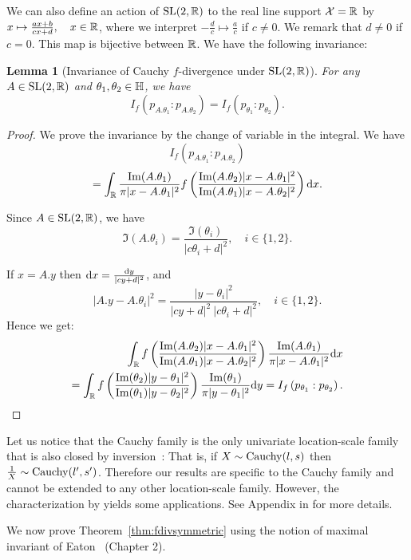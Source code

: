 \documentclass[journal]{IEEEtran}
\newtheorem{lemma}[theorem]{Lemma}
\begin{document}
We can also define an action of $\mathrm{SL}(2, \mathbb{R})$ to the real line support $\mathcal{X}={\mathbb{R}}$ by 
$x \mapsto \frac{ax+b}{cx+d}, \ \ \ x \in {\mathbb{R}}$,
where we interpret $-\frac{d}{c} \mapsto \frac{a}{c}$
if $c \not= 0$. 
We remark that $d \not= 0$ if $c = 0$. 
This map is bijective between ${\mathbb{R}}$. 
We have the following invariance:

\begin{lemma}[Invariance of Cauchy $f$-divergence under $\mathrm{SL}(2, {\mathbb{R}})$]\label{lemma:finv}
For any $A\in\mathrm{SL}(2, {\mathbb{R}})$ and $\theta_1,\theta_2\in\mathbb{H}$, we have
$$
I_f(p_{A.\theta_1}:p_{A.\theta_2})=I_f(p_{\theta_1}:p_{\theta_2}).
$$
\end{lemma}

\begin{proof} 
We prove the invariance by the change of variable in the integral. 
We have 
$$
I_f (p_{A.\theta_1}: p_{A.\theta_2}) 
$$
$$= \int_{{\mathbb{R}}} 
\frac{\mathrm{Im}(A.\theta_1)}{\pi |x- A.\theta_1|^2} f\left( \frac{\mathrm{Im}(A.\theta_2)  |x- A.\theta_1|^2}{\mathrm{Im}(A.\theta_1)  |x- A.\theta_2|^2}\right)  \mathrm{d}x. 
$$

Since $A \in \mathrm{SL}(2, \mathbb{R})$, 
we have 
$$
\Im(A.\theta_i) = \frac{\Im(\theta_i)}{|c\theta_i + d|^2}, \quad i\in\{1,2\}.
$$

If $x = A.y$ then 
$\mathrm{d}x = \frac{\mathrm{d}y}{|cy+d|^2}$,
and 
$$
\left|A.y- A.\theta_i \right|^2 = \frac{|y - \theta_i|^2}{|cy + d|^2\ |c\theta_i + d|^2}, \quad i\in\{1,2\}
.$$
Hence we get:
\begin{eqnarray*}
\int_{{\mathbb{R}}} f\left( \frac{\mathrm{Im}(A.\theta_2)  |x- A.\theta_1|^2}{\mathrm{Im}(A.\theta_1)  |x- A.\theta_2|^2}\right) \frac{\mathrm{Im}(A.\theta_1)}{\pi |x- A.\theta_1|^2} \mathrm{d}x \\
=
 \int_{{\mathbb{R}}} f\left( \frac{\mathrm{Im}(\theta_2)  |y- \theta_1|^2}{\mathrm{Im}(\theta_1)  |y- \theta_2|^2}\right) \frac{\mathrm{Im}(\theta_1)}{\pi |y- \theta_1|^2} \mathrm{d}y = I_f \left(p_{\theta_1} : p_{\theta_2} \right).
\end{eqnarray*}
\end{proof}

Let us notice that the Cauchy family is the only univariate location-scale family that is also closed by inversion~\cite{KnightCauchy-1976}:
That is, if $X\sim\mathrm{Cauchy}(l,s)$ then $\frac{1}{X}\sim\mathrm{Cauchy}(l',s')$.
 Therefore our results are specific to the Cauchy family and cannot be extended to any other location-scale family.
However, the characterization by \cite{KnightCauchy-1976} yields some applications. 
See Appendix in \cite{Nielsen2021f} for more details. 

We now prove Theorem~\ref{thm:fdivsymmetric} using the notion of maximal invariant of Eaton~\cite{Eaton-1989} (Chapter 2). 
\end{document}
